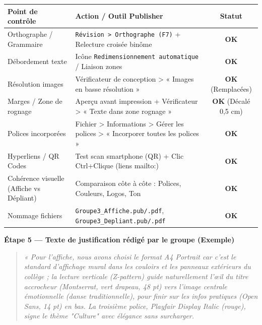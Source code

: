 \documentclass[11pt]{article}
\begin{document}
\begin{exoresolu}
\begin{center}
\begin{tabularx}{\linewidth}{|l|X|c|}\hline
\textbf{Point de contrôle} & \textbf{Action / Outil Publisher} & \textbf{Statut} \\\hline
Orthographe / Grammaire & \texttt{Révision > Orthographe (F7)} + Relecture croisée binôme & \textbf{OK} \\\hline
Débordement texte & Icône \texttt{Redimensionnement automatique} / Liaison zones & \textbf{OK} \\\hline
Résolution images & Vérificateur de conception > « Images en basse résolution » & \textbf{OK} (Remplacées) \\\hline
Marges / Zone de rognage & Aperçu avant impression + Vérificateur > « Texte dans zone rognage » & \textbf{OK} (Décalé 0,5 cm) \\\hline
Polices incorporées & Fichier > Informations > Gérer les polices > « Incorporer toutes les polices » & \textbf{OK} \\\hline
Hyperliens / QR Codes & Test scan smartphone (QR) + Clic Ctrl+Clique (liens mailto:) & \textbf{OK} \\\hline
Cohérence visuelle (Affiche vs Dépliant) & Comparaison côte à côte : Polices, Couleurs, Logos, Ton & \textbf{OK} \\\hline
Nommage fichiers & \texttt{Groupe3\_Affiche.pub/.pdf}, \texttt{Groupe3\_Depliant.pub/.pdf} & \textbf{OK} \\\hline
\end{tabularx}
\end{center}

\textbf{Étape 5 — Texte de justification rédigé par le groupe (Exemple)}

\begin{quote}
{\itshape « Pour l'affiche, nous avons choisi le format A4 Portrait car c'est le standard d'affichage mural dans les couloirs et les panneaux extérieurs du collège ; la lecture verticale (Z-pattern) guide naturellement l'œil du titre accrocheur (Montserrat, vert drapeau, 48 pt) vers l'image centrale émotionnelle (danse traditionnelle), pour finir sur les infos pratiques (Open Sans, 14 pt) en bas. La troisième police, Playfair Display Italic (rouge), signe le thème "Culture" avec élégance sans surcharger. 

}
\end{quote}
\end{exoresolu}
\end{document}
